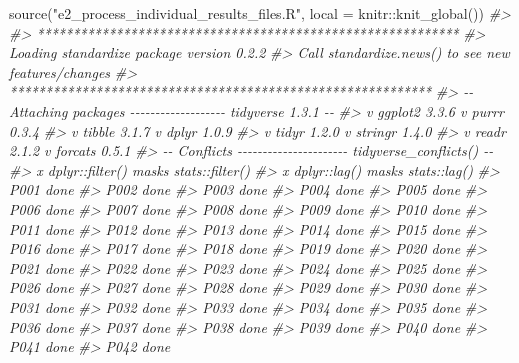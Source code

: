 \documentclass[
]{book}
\newenvironment{Shaded}{\begin{snugshade}}{\end{snugshade}}
\newcommand{\AttributeTok}[1]{\textcolor[rgb]{0.77,0.63,0.00}{#1}}
\newcommand{\CommentTok}[1]{\textcolor[rgb]{0.56,0.35,0.01}{\textit{#1}}}
\newcommand{\FunctionTok}[1]{\textcolor[rgb]{0.00,0.00,0.00}{#1}}
\newcommand{\NormalTok}[1]{#1}
\newcommand{\SpecialCharTok}[1]{\textcolor[rgb]{0.00,0.00,0.00}{#1}}
\newcommand{\StringTok}[1]{\textcolor[rgb]{0.31,0.60,0.02}{#1}}
\begin{document}
\begin{Shaded}
\begin{Highlighting}[]
\FunctionTok{source}\NormalTok{(}\StringTok{"e2\_process\_individual\_results\_files.R"}\NormalTok{, }\AttributeTok{local =}\NormalTok{ knitr}\SpecialCharTok{::}\FunctionTok{knit\_global}\NormalTok{())}
\CommentTok{\#\textgreater{} }
\CommentTok{\#\textgreater{}  *********************************************************** }
\CommentTok{\#\textgreater{}           Loading standardize package version 0.2.2          }
\CommentTok{\#\textgreater{}      Call standardize.news() to see new features/changes     }
\CommentTok{\#\textgreater{}  ***********************************************************}
\CommentTok{\#\textgreater{} {-}{-} Attaching packages {-}{-}{-}{-}{-}{-}{-}{-}{-}{-}{-}{-}{-}{-}{-}{-}{-}{-}{-} tidyverse 1.3.1 {-}{-}}
\CommentTok{\#\textgreater{} v ggplot2 3.3.6     v purrr   0.3.4}
\CommentTok{\#\textgreater{} v tibble  3.1.7     v dplyr   1.0.9}
\CommentTok{\#\textgreater{} v tidyr   1.2.0     v stringr 1.4.0}
\CommentTok{\#\textgreater{} v readr   2.1.2     v forcats 0.5.1}
\CommentTok{\#\textgreater{} {-}{-} Conflicts {-}{-}{-}{-}{-}{-}{-}{-}{-}{-}{-}{-}{-}{-}{-}{-}{-}{-}{-}{-}{-}{-} tidyverse\_conflicts() {-}{-}}
\CommentTok{\#\textgreater{} x dplyr::filter() masks stats::filter()}
\CommentTok{\#\textgreater{} x dplyr::lag()    masks stats::lag()}
\CommentTok{\#\textgreater{} P001 done}
\CommentTok{\#\textgreater{} P002 done}
\CommentTok{\#\textgreater{} P003 done}
\CommentTok{\#\textgreater{} P004 done}
\CommentTok{\#\textgreater{} P005 done}
\CommentTok{\#\textgreater{} P006 done}
\CommentTok{\#\textgreater{} P007 done}
\CommentTok{\#\textgreater{} P008 done}
\CommentTok{\#\textgreater{} P009 done}
\CommentTok{\#\textgreater{} P010 done}
\CommentTok{\#\textgreater{} P011 done}
\CommentTok{\#\textgreater{} P012 done}
\CommentTok{\#\textgreater{} P013 done}
\CommentTok{\#\textgreater{} P014 done}
\CommentTok{\#\textgreater{} P015 done}
\CommentTok{\#\textgreater{} P016 done}
\CommentTok{\#\textgreater{} P017 done}
\CommentTok{\#\textgreater{} P018 done}
\CommentTok{\#\textgreater{} P019 done}
\CommentTok{\#\textgreater{} P020 done}
\CommentTok{\#\textgreater{} P021 done}
\CommentTok{\#\textgreater{} P022 done}
\CommentTok{\#\textgreater{} P023 done}
\CommentTok{\#\textgreater{} P024 done}
\CommentTok{\#\textgreater{} P025 done}
\CommentTok{\#\textgreater{} P026 done}
\CommentTok{\#\textgreater{} P027 done}
\CommentTok{\#\textgreater{} P028 done}
\CommentTok{\#\textgreater{} P029 done}
\CommentTok{\#\textgreater{} P030 done}
\CommentTok{\#\textgreater{} P031 done}
\CommentTok{\#\textgreater{} P032 done}
\CommentTok{\#\textgreater{} P033 done}
\CommentTok{\#\textgreater{} P034 done}
\CommentTok{\#\textgreater{} P035 done}
\CommentTok{\#\textgreater{} P036 done}
\CommentTok{\#\textgreater{} P037 done}
\CommentTok{\#\textgreater{} P038 done}
\CommentTok{\#\textgreater{} P039 done}
\CommentTok{\#\textgreater{} P040 done}
\CommentTok{\#\textgreater{} P041 done}
\CommentTok{\#\textgreater{} P042 done}
\end{Highlighting}
\end{Shaded}
\end{document}
